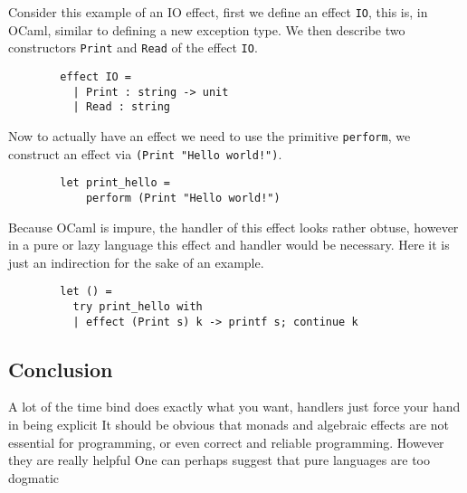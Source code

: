 \begin{example}
    Consider this example of an IO effect,
    first we define an effect \texttt{IO},
    this is, in OCaml, similar to defining
    a new exception type.
    We then describe two constructors
    \texttt{Print} and \texttt{Read}
    of the effect \texttt{IO}.
    \begin{verbatim}
        effect IO =
          | Print : string -> unit
          | Read : string\end{verbatim}
    Now to actually have an effect we need to use the primitive \texttt{perform},
    we construct an effect via \texttt{(Print "Hello world!")}.
    \begin{verbatim}
        let print_hello =
            perform (Print "Hello world!")\end{verbatim}
    Because OCaml is impure, the handler of this effect looks rather obtuse,
    however in a pure or lazy language this effect and handler would be necessary.
    Here it is just an indirection for the sake of an example.
    \begin{verbatim}
        let () =
          try print_hello with
          | effect (Print s) k -> printf s; continue k\end{verbatim}
\end{example}
\subsection{Conclusion}

A lot of the time bind does exactly what you want,
handlers just force your hand in being explicit
It should be obvious that monads and algebraic effects
are not essential for programming,
or even correct and reliable programming.
However they are really helpful
One can perhaps suggest that pure languages are too dogmatic

